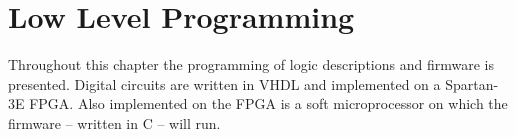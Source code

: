 \chapter{Low Level Programming} %
\label{chap:low_level_programming}

Throughout this chapter the programming of logic descriptions and firmware is presented.
Digital circuits are written in VHDL and implemented on a Spartan-3E FPGA. Also implemented on the FPGA is a soft microprocessor on which the firmware -- written in C -- will run.

    
	

